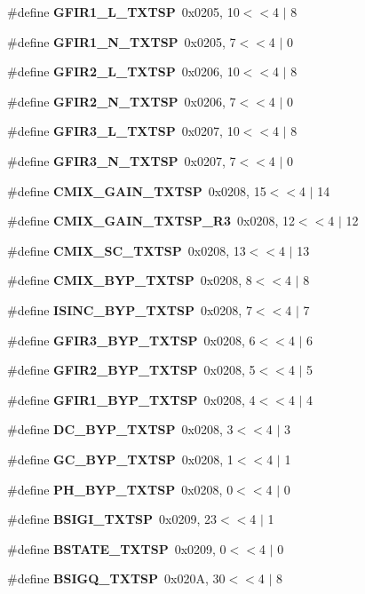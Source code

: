 \begin{DoxyCompactItemize}
\item 
\#define {\bf G\+F\+I\+R1\+\_\+\+L\+\_\+\+T\+X\+T\+SP}~0x0205, 10$<$$<$4 $\vert$  8
\item 
\#define {\bf G\+F\+I\+R1\+\_\+\+N\+\_\+\+T\+X\+T\+SP}~0x0205, 7$<$$<$4 $\vert$  0
\item 
\#define {\bf G\+F\+I\+R2\+\_\+\+L\+\_\+\+T\+X\+T\+SP}~0x0206, 10$<$$<$4 $\vert$  8
\item 
\#define {\bf G\+F\+I\+R2\+\_\+\+N\+\_\+\+T\+X\+T\+SP}~0x0206, 7$<$$<$4 $\vert$  0
\item 
\#define {\bf G\+F\+I\+R3\+\_\+\+L\+\_\+\+T\+X\+T\+SP}~0x0207, 10$<$$<$4 $\vert$  8
\item 
\#define {\bf G\+F\+I\+R3\+\_\+\+N\+\_\+\+T\+X\+T\+SP}~0x0207, 7$<$$<$4 $\vert$  0
\item 
\#define {\bf C\+M\+I\+X\+\_\+\+G\+A\+I\+N\+\_\+\+T\+X\+T\+SP}~0x0208, 15$<$$<$4 $\vert$  14
\item 
\#define {\bf C\+M\+I\+X\+\_\+\+G\+A\+I\+N\+\_\+\+T\+X\+T\+S\+P\+\_\+\+R3}~0x0208, 12$<$$<$4 $\vert$  12
\item 
\#define {\bf C\+M\+I\+X\+\_\+\+S\+C\+\_\+\+T\+X\+T\+SP}~0x0208, 13$<$$<$4 $\vert$  13
\item 
\#define {\bf C\+M\+I\+X\+\_\+\+B\+Y\+P\+\_\+\+T\+X\+T\+SP}~0x0208, 8$<$$<$4 $\vert$  8
\item 
\#define {\bf I\+S\+I\+N\+C\+\_\+\+B\+Y\+P\+\_\+\+T\+X\+T\+SP}~0x0208, 7$<$$<$4 $\vert$  7
\item 
\#define {\bf G\+F\+I\+R3\+\_\+\+B\+Y\+P\+\_\+\+T\+X\+T\+SP}~0x0208, 6$<$$<$4 $\vert$  6
\item 
\#define {\bf G\+F\+I\+R2\+\_\+\+B\+Y\+P\+\_\+\+T\+X\+T\+SP}~0x0208, 5$<$$<$4 $\vert$  5
\item 
\#define {\bf G\+F\+I\+R1\+\_\+\+B\+Y\+P\+\_\+\+T\+X\+T\+SP}~0x0208, 4$<$$<$4 $\vert$  4
\item 
\#define {\bf D\+C\+\_\+\+B\+Y\+P\+\_\+\+T\+X\+T\+SP}~0x0208, 3$<$$<$4 $\vert$  3
\item 
\#define {\bf G\+C\+\_\+\+B\+Y\+P\+\_\+\+T\+X\+T\+SP}~0x0208, 1$<$$<$4 $\vert$  1
\item 
\#define {\bf P\+H\+\_\+\+B\+Y\+P\+\_\+\+T\+X\+T\+SP}~0x0208, 0$<$$<$4 $\vert$  0
\item 
\#define {\bf B\+S\+I\+G\+I\+\_\+\+T\+X\+T\+SP}~0x0209, 23$<$$<$4 $\vert$  1
\item 
\#define {\bf B\+S\+T\+A\+T\+E\+\_\+\+T\+X\+T\+SP}~0x0209, 0$<$$<$4 $\vert$  0
\item 
\#define {\bf B\+S\+I\+G\+Q\+\_\+\+T\+X\+T\+SP}~0x020\+A, 30$<$$<$4 $\vert$  8

\end{DoxyCompactItemize}
